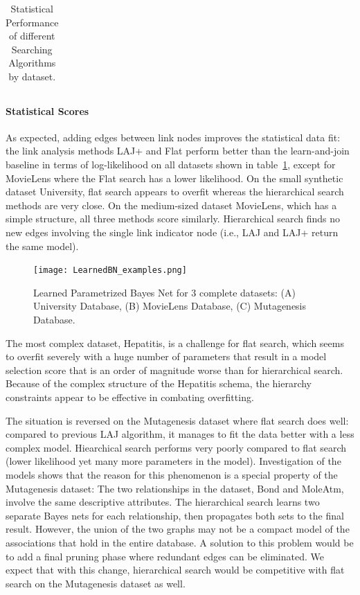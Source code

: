 \documentclass[runningheads,a4paper]{llncs}
\begin{document}
\begin{table}[h]
\begin{center}
{\begin{tabular}{|c|c|c|c|c| }
      \hline
    \end{tabular}
}
\end{center}



\caption{Statistical Performance of different Searching Algorithms by dataset.  }
\label{table:result_scores}
\end{table}
\paragraph{Statistical Scores}

As expected, adding edges between link nodes improves the statistical data fit: 
the link analysis methods LAJ+ and Flat perform better than the learn-and-join baseline in terms of log-likelihood on all datasets shown in table~\ref{table:result_scores}, except for MovieLens where the Flat search has a lower likelihood. On the small synthetic dataset University, flat search appears to overfit whereas the hierarchical search methods are very close. On the medium-sized dataset MovieLens, which has a simple structure, all three methods score similarly. Hierarchical search finds no new edges involving the single link indicator node (i.e., LAJ and LAJ+ return the same model). 


\begin{figure}[htbp] %
\texttt{[image: LearnedBN\_examples.png]}
  \caption{Learned Parametrized Bayes Net for 3 complete datasets: (A) University Database, (B) MovieLens Database, (C) Mutagenesis Database.}
   \label{fig:BN_Examples}
\end{figure}

The most complex dataset, Hepatitis, is a challenge for flat search, which seems to overfit severely with a huge number of parameters that result in a model selection score that is an order of magnitude worse than for hierarchical search. Because of the complex structure of the Hepatitis schema, the hierarchy constraints appear to be effective in combating overfitting.

The situation is reversed on the Mutagenesis dataset where flat search does well: compared to previous LAJ algorithm, %
it manages to fit the data better with a less complex model. 
Hiearchical search performs very poorly compared to flat search (lower likelihood yet many more parameters in the model). Investigation of the models shows that the reason for this phenomenon is a special property of the Mutagenesis dataset: The two relationships in the dataset, Bond and MoleAtm, involve the same descriptive attributes. The hierarchical search learns two separate Bayes nets for each relationship, then propagates both sets to the final result. However, the union of the two graphs may not be a compact model of the associations that hold in the entire database. A solution to this problem would be to add a final pruning phase where redundant edges can be eliminated. We expect that with this change, hierarchical search would be competitive with flat search on the Mutagenesis dataset as well.
\end{document}
